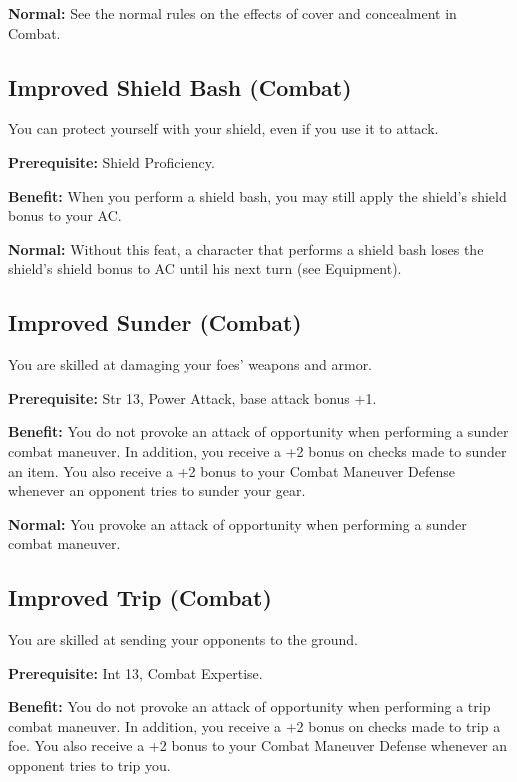 \textbf{Normal:} See the normal rules on the effects of cover and concealment in Combat. 
				
\subsection{Improved Shield Bash (Combat)}

				
You can protect yourself with your shield, even if you use it to attack.
				
\textbf{Prerequisite:} Shield Proficiency.
				
\textbf{Benefit:} When you perform a shield bash, you may still apply the shield's shield bonus to your AC.
				
\textbf{Normal:} Without this feat, a character that performs a shield bash loses the shield's shield bonus to AC until his next turn (see Equipment).
				
\subsection{Improved Sunder (Combat)}

				
You are skilled at damaging your foes' weapons and armor.
				
\textbf{Prerequisite:} Str 13, Power Attack, base attack bonus +1.
				
\textbf{Benefit:} You do not provoke an attack of opportunity when performing a sunder combat maneuver. In addition, you receive a +2 bonus on checks made to sunder an item. You also receive a +2 bonus to your Combat Maneuver Defense whenever an opponent tries to sunder your gear. 
				
\textbf{Normal:} You provoke an attack of opportunity when performing a sunder combat maneuver.
				
\subsection{Improved Trip (Combat)}

				
You are skilled at sending your opponents to the ground.
				
\textbf{Prerequisite:} Int 13, Combat Expertise.
				
\textbf{Benefit:} You do not provoke an attack of opportunity when performing a trip combat maneuver. In addition, you receive a +2 bonus on checks made to trip a foe. You also receive a +2 bonus to your Combat Maneuver Defense whenever an opponent tries to trip you. 
				
